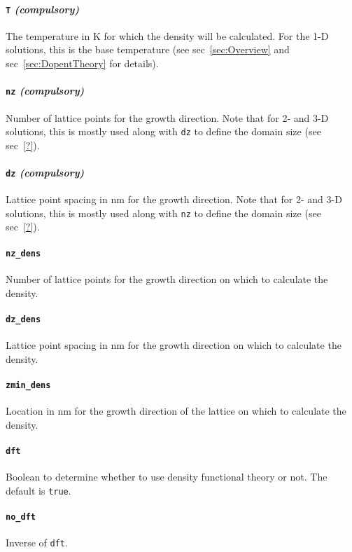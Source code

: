 \documentclass[12pt]{article}
\begin{document}
\paragraph{\texttt{T} \emph{(compulsory)}}
The temperature in K for which the density will be calculated.  For the 1-D solutions,
this is the base temperature (see sec~\ref{sec:Overview} and sec~\ref{sec:DopentTheory}
for details).

\paragraph{\texttt{nz} \emph{(compulsory)}}
Number of lattice points for the growth direction.  Note that for 2- and 3-D solutions,
this is mostly used along with \texttt{dz} to define the domain size (see sec~\ref{?}).

\paragraph{\texttt{dz} \emph{(compulsory)}}
Lattice point spacing in nm for the growth direction.  Note that for 2- and 3-D
solutions, this is mostly used along with \texttt{nz} to define the domain size
(see sec~\ref{?}).

\paragraph{\texttt{nz\_dens}}
Number of lattice points for the growth direction on which to calculate the density.

\paragraph{\texttt{dz\_dens}}
Lattice point spacing in nm for the growth direction on which to calculate the density.

\paragraph{\texttt{zmin\_dens}}
Location in nm for the growth direction of the lattice on which to calculate the density.

\paragraph{\texttt{dft}}
Boolean to determine whether to use density functional theory or not.  The default is
\texttt{true}.

\paragraph{\texttt{no\_dft}}
Inverse of \texttt{dft}.
\end{document}
